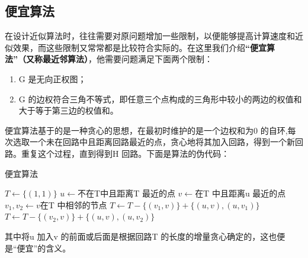 \documentclass[11pt,a4paper,openany]{book}
\begin{document}
\subsection{便宜算法}
\indent 在设计近似算法时，往往需要对原问题增加一些限制，以便能够提高计算速度和近似效果，而这些限制又常常都是比较符合实际的。在这里我们介绍\textbf{“便宜算法”（又称最近邻算法）}，他需要问题满足下面两个限制：\\
\begin{enumerate}
  \item G 是无向正权图；
  \item G 的边权符合三角不等式，即任意三个点构成的三角形中较小的两边的权值和大于等于第三边的权值和。
\end{enumerate}
\indent 便宜算法基于的是一种贪心的思想，在最初时维护的是一个边权和为0 的自环,每次选取一个未在回路中且距离回路最近的点，贪心地将其加入回路，得到一个新回路。重复这个过程，直到得到H 回路。下面是算法的伪代码：\\
\begin{algorithm}
\renewcommand{\algorithmicrequire}{\textbf{Input:}}
\renewcommand\algorithmicensure {\textbf{Output:}}
    \caption{便宜算法}
    \begin{algorithmic}[1]
      \label{alg:pysf}  %
      \STATE $T\leftarrow\{(1,1)\}$
          \STATE $u\leftarrow$不在T中且距离T 最近的点
          \STATE $v\leftarrow$在T 中且距离u 最近的点
          \STATE $v_1, v_2 \leftarrow v$在T 中相邻的节点
             \STATE $ T\leftarrow T −\{(v_1,v)\} + \{(u,v),(u,v_1)\}$
          \ELSE{}
              \STATE  $ T\leftarrow T −\{(v_2,v)\} + \{(u,v),(u,v_2)\}$
          \ENDIF
      \ENDWHILE
      
    \end{algorithmic}
\end{algorithm}
\indent 其中将u 加入v 的前面或后面是根据回路T 的长度的增量贪心确定的，这也便是“便宜”的含义。\\
\end{document}
